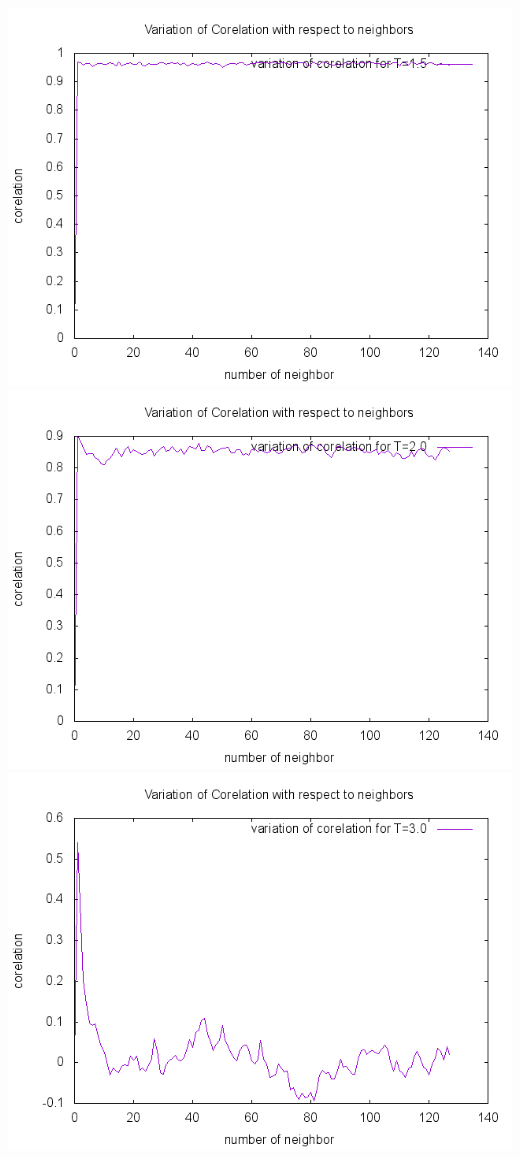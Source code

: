 \documentclass[a4paper,12pt]{article}
\begin{document}
\begin{center}
\includegraphics[scale=.8]{C1.png}
\includegraphics[scale=.8]{C2.png}
\includegraphics[scale=.8]{C3.png}

\end{center}
\end{document}
